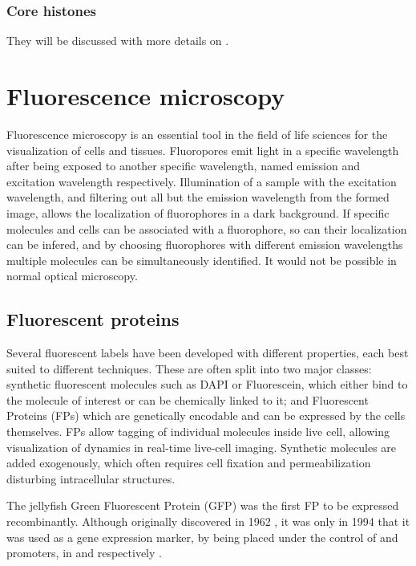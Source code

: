     \subsubsection{Core histones}
    
      They will be discussed with more details on .


\section{Fluorescence microscopy}

  Fluorescence microscopy is an essential tool in the field of life
  sciences for the visualization of cells and tissues.
  Fluoropores emit light in a specific wavelength after
  being exposed to another specific wavelength, named
  emission and excitation wavelength respectively.
  Illumination of a sample with the excitation wavelength, and filtering
  out all but the emission wavelength from the formed image, allows
  the localization of fluorophores in a dark background.
  If specific molecules and cells can be associated with a fluorophore,
  so can their localization can be infered, and by choosing fluorophores
  with different emission wavelengths multiple molecules can be
  simultaneously identified.
  It would not be possible in normal optical microscopy.

  \subsection{Fluorescent proteins}
    Several fluorescent labels have been developed with different
    properties, each best suited to different techniques.
    These are often split into two major classes: synthetic fluorescent
    molecules such as DAPI or Fluorescein, which either bind to the molecule of
    interest or can be chemically linked to it; and Fluorescent Proteins (FPs)
    which are genetically encodable and can be expressed by the cells themselves.
    FPs allow tagging of individual molecules inside live cell, allowing
    visualization of dynamics in real-time live-cell imaging.
    Synthetic molecules are added exogenously, which often requires cell
    fixation and permeabilization disturbing intracellular structures.

    The  jellyfish Green Fluorescent Protein (GFP) was
    the first FP to be expressed recombinantly.
    Although originally discovered in 1962 \citep{shimomura1962-gfp-discovery},
    it was only in 1994 that it was used as a gene expression
    marker, by being placed under the control of  and
     promoters, in  and 
    respectively \citep{gfp-first-expression-marker}.

